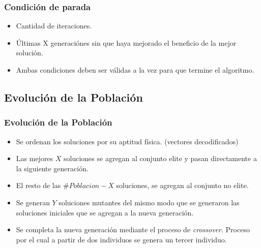 \documentclass{beamer}
\begin{document}
\begin{frame}
\frametitle{Condición de parada}

\begin{itemize}
    \item Cantidad de iteraciones.
    \pause
    \item \'Ultimas X generaciónes sin que haya mejorado el beneficio de la mejor solución.
    \pause
    \item Ambas condiciones deben ser válidas a la vez para que termine el algoritmo.
\end{itemize}

\end{frame}


\subsection{Evolución de la Población}

\begin{frame}
\frametitle{Evolución de la Población}

\begin{itemize}
    \item Se ordenan los soluciones por su aptitud física. (vectores decodificados)
    \pause
    \item Las mejores $X$ soluciones se agregan al conjunto elite y pasan directamente a la siguiente generación.
    \pause
    \item El resto de las $\#Poblacion-X$ soluciones, se agregan al conjunto no elite.
    \pause
    \item Se generan $Y$ soluciones mutantes del mismo modo que se generaron las soluciones iniciales que se agregan a la nueva generación.
    \pause
    \item Se completa la nueva generación mediante el proceso de \textit{crossover}. Proceso por el cual a partir de dos individuos se genera un tercer individuo.
\end{itemize}

\end{frame}

\end{document}
